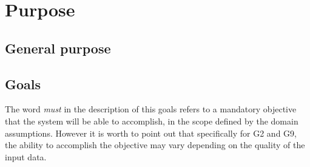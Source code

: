 \section{Purpose}

\subsection{General purpose}


\subsection{Goals}

\begin{description}
\end{description}

\noindent
The word \emph{must} in the description of this goals refers to a mandatory
objective that the system will be able to accomplish, in the scope defined
by the domain assumptions.
However it is worth to point out that specifically for G2 and G9,
the ability to accomplish the objective may vary depending on the
quality of the input data.